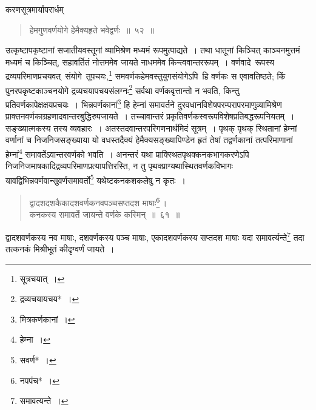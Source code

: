 \documentclass[10pt, openany]{book}
\begin{document}
{{{\newpage

{करणसूत्रमार्यापरार्धम्\textemdash}

 \label{52}
\begin{quote}
{\bs  हेमगुणवर्णयोगे हेमैक्यहृते भवेद्वर्णः~॥~५२~॥}\end{quote}

{उत्कृष्टापकृष्टानां सजातीयवस्तूनां व्यामिश्रेण मध्यमं रूपमुत्पाद्यते~।
तथा धातूनां किञ्चित् काञ्चनमुत्तमं मध्यमं च किञ्चित्, सहावर्तितं नोत्तममेव जायते नाधममेव
किन्त्ववान्तररूपम्~। वर्णवादे \,रूपस्य \,द्रव्यपरिमाणप्रचयवत् \,संयोगे \,तूपचयः,\renewcommand{\thefootnote}{\s १}\footnote{\s सूत्रचयात्~।} समवर्णकहेमवस्तुयुगसंयोगेऽपि \,हि वर्णकः}
{स एवावतिष्ठते; किं पुनरपकृष्टकाञ्चनयोगे द्रव्यचयापचयसंलग्नः\renewcommand{\thefootnote}{\s २}\footnote{\s द्रव्यचयायचय*~।}  सर्वथा
वर्णकवृत्तान्तो न}
{भवति, किन्तु प्रतिवर्णकापेक्षक्षयप्रचयः~। भिन्नवर्णकानां\renewcommand{\thefootnote}{\s ३}\footnote{\s मित्रकर्णकानां~।}  हि
हेम्नां समावर्तने दुरवधानविशेषपरम्परापरमाणुव्यामिश्रेण प्राक्तनवर्णकाग्रहणादवान्तरबुद्धिरुपजायते~।
तच्चावान्तरं प्रकृतिवर्णकस्वरूपविशेषप्रतिबद्धरूपनियतम्~। सङ्ख्यात्मकस्य तस्य व्यवहारः~।
अतस्तदवान्तरपरिगणनार्थमिदं सूत्रम्~। पृथक् पृथक् स्थितानां हेम्नां वर्णानां च
निजनिजसङ्ख्याया यो वधस्तदैक्यं}
{हेमैक्यसङ्ख्यापिण्डेन हृतं तेषां तद्वर्णकानां तत्परिमाणानां
हेम्नां\renewcommand{\thefootnote}{\s ४}\footnote{\s हेम्ना~।}  समावर्तेऽवान्तरवर्णको}
{भवति~। अनन्तरं यथा प्राक्स्थितपृथक्कनकभागकरणेऽपि
निजनिजमाषकादिद्रव्यपरिमाणप्रत्यापत्तिरस्ति, न तु पृथक्प्राग्यथास्थितवर्णकविभागः
यावद्विभिन्नवर्णवान्सुवर्णसमावर्तो\renewcommand{\thefootnote}{\s ५}\footnote{\s *सवर्ण*~।} यथेष्टकनकशकलेषु न कृतः~।}

\vspace{0.3cm}{उदाहरणम्\textemdash}

\begin{quote}
    
{\eg  द्वादशदशकैकादशवर्णकनवपञ्चसप्तदश माषाः\renewcommand{\thefootnote}{\s ६}\footnote{\s *नपपंच*~।}\,। \\
 कनकस्य समावर्ते जायन्ते वर्णके कस्मिन्~॥~६१~॥}\end{quote}

{द्वादशवर्णकस्य नव माषाः, दशवर्णकस्य पञ्च माषाः, एकादशवर्णकस्य सप्तदश
माषाः}
{यदा समावर्त्यन्ते\renewcommand{\thefootnote}{\s ७}\footnote{\s समावत्यन्ते~।}  तदा तत्कनकं मिश्रीभूतं कीदृग्वर्णं जायते~।}

}}}
\end{document}

